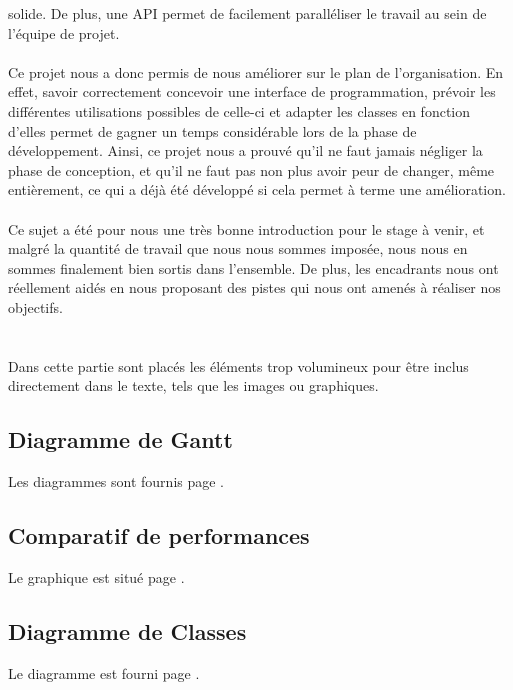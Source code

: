 \documentclass[a4paper]{memoir}
\begin{document}
		solide. De plus, une API permet de facilement paralléliser le travail au sein de l'équipe de projet.\\
		\\
		Ce projet nous a donc permis de nous améliorer sur le plan de l'organisation. En effet, savoir correctement concevoir une interface de programmation,
		prévoir les différentes utilisations possibles de celle-ci et adapter les classes en fonction d'elles permet de gagner un temps considérable lors de 
		la phase de développement. Ainsi, ce projet nous a prouvé qu'il ne faut jamais négliger la phase de conception, et qu'il ne faut pas non plus avoir 
		peur de changer, même entièrement, ce qui a déjà été développé si cela permet à terme une amélioration.\\
		\\
		Ce sujet a été pour nous une très bonne introduction pour le stage à venir, et malgré la quantité de travail que nous nous sommes imposée, nous nous 
		en sommes finalement bien sortis dans l'ensemble. De plus, les encadrants nous ont réellement aidés en nous proposant des pistes qui nous ont amenés 
		à réaliser nos objectifs.
	
	\appendix
	\chapter{}
		Dans cette partie sont placés les éléments trop volumineux pour être inclus directement dans le texte, tels que les images ou graphiques.\\
		
		\section{Diagramme de Gantt}
			Les diagrammes sont fournis page \pageref{fig:gantt}.
			
		\section{Comparatif de performances}
			Le graphique est situé page \pageref{fig:analyse}.
			
		\section{Diagramme de Classes}
			Le diagramme est fourni page \pageref{fig:diagClass}.
			
\end{document}
